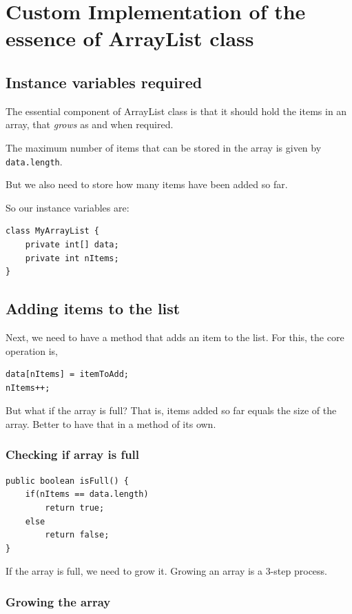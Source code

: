 \section{Custom Implementation of the essence of ArrayList class}

\subsection{Instance variables required}

The essential component of ArrayList class is that it should hold the items in an array, that \emph{grows} as and when required.

The maximum number of items that can be stored in the array is given by \texttt{data.length}.

But we also need to store how many items have been added so far.

So our instance variables are:

\begin{lstlisting}
class MyArrayList {
	private int[] data;
	private int nItems;	
}
\end{lstlisting}

\subsection{Adding items to the list}

Next, we need to have a method that adds an item to the list. For this, the core operation is,

\begin{lstlisting}
data[nItems] = itemToAdd;
nItems++;	
\end{lstlisting}

But what if the array is full? That is, items added so far equals the size of the array. Better to have that in a method of its own.

\subsubsection{Checking if array is full}

\begin{lstlisting}
public boolean isFull() {
	if(nItems == data.length)
		return true;
	else
		return false;
}
\end{lstlisting}

If the array is full, we need to grow it. Growing an array is a 3-step process.

\subsubsection{Growing the array}


